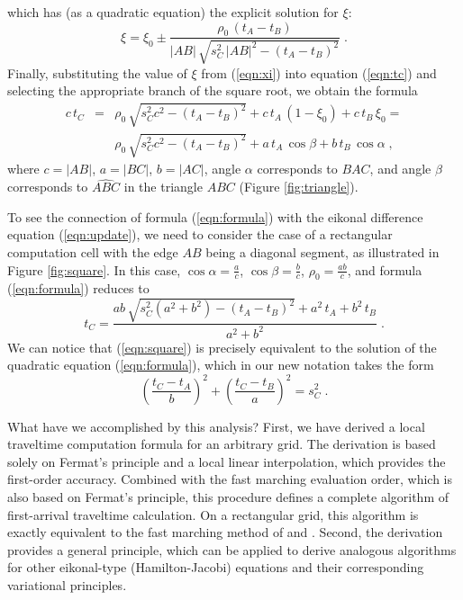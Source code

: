 which has (as a quadratic equation) the explicit solution for $\xi$:
\begin{equation}
  \label{eqn:xi}
  \xi = \xi_0 \pm \frac{\rho_0\,(t_A - t_B)}
  {|AB|\,\sqrt{s_C^2\,|AB|^2 - (t_A - t_B)^2}}\;.
\end{equation}
Finally, substituting the value of $\xi$ from (\ref{eqn:xi}) into
equation (\ref{eqn:tc}) and selecting the appropriate branch of the
square root, we obtain the formula
\begin{eqnarray}\label{eqn:formula}
  c\,t_C & = & \rho_0\,\sqrt{s_C^2 c^2 - (t_A - t_B)^2} +
  c\,t_A\,(1-\xi_0) + c\,t_B\,\xi_0 = \nonumber \\
  & & \rho_0\,\sqrt{s_C^2 c^2 - (t_A - t_B)^2} +
  a\,t_A\,\cos{\beta} + b\,t_B\,\cos{\alpha}\;,
\end{eqnarray}
where $c = |AB|$, $a = |BC|$, $b = |AC|$, angle $\alpha$
corresponds to $\widehat{BAC}$, and angle $\beta$ corresponds to
$\widehat{ABC}$ in the triangle $ABC$ (Figure \ref{fig:triangle}).

\par
To see the connection of formula (\ref{eqn:formula}) with the eikonal
difference equation (\ref{eqn:update}), we need to consider the case
of a rectangular computation cell with the edge $AB$ being a diagonal
segment, as illustrated in Figure \ref{fig:square}. In this case,
$\cos{\alpha} = \frac{a}{c}$, $\cos{\beta} = \frac{b}{c}$, $\rho_0 =
\frac{ab}{c}$, and formula (\ref{eqn:formula}) reduces to 
\begin{equation}\label{eqn:square}
  t_C = \frac{ab\,\sqrt{s_C^2 (a^2 + b^2) - (t_A - t_B)^2} + a^2\,t_A + b^2\,t_B}
{a^2+b^2}\;.
\end{equation}
We can notice that (\ref{eqn:square}) is precisely equivalent to the
solution of the quadratic equation (\ref{eqn:formula}), which in our
new notation takes the form
\begin{equation}\label{eqn:supdate}
  \left(\frac{t_C - t_A}{b}\right)^2 +
  \left(\frac{t_C - t_B}{a}\right)^2 = s_C^2\;.
\end{equation}
\par
What have we accomplished by this analysis? First, we have derived a
local traveltime computation formula for an arbitrary grid.  The
derivation is based solely on Fermat's principle and a local linear
interpolation, which provides the first-order accuracy.  Combined with
the fast marching evaluation order, which is also based on Fermat's
principle, this procedure defines a complete algorithm of
first-arrival traveltime calculation. On a rectangular grid, this
algorithm is exactly equivalent to the fast marching method of
\cite{paper2} and \cite{mihai}.  Second, the derivation
provides a general principle, which can be applied to derive analogous
algorithms for other eikonal-type (Hamilton-Jacobi) equations and
their corresponding variational principles.

